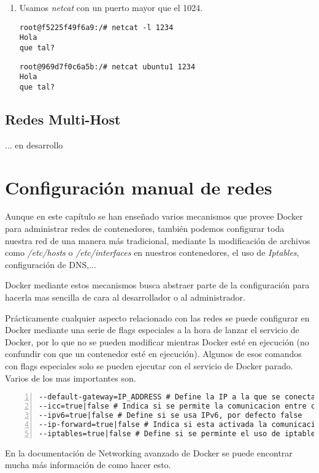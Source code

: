 \begin{enumerate}
\begin{enumerate}
					\item Usamos \textit{netcat} con un puerto mayor que el 1024.
					\begin{lstlisting}[style=consola]
root@f5225f49f6a9:/# netcat -l 1234
Hola
que tal?
					\end{lstlisting}
					\begin{lstlisting}[style=consola]
root@969d7f0c6a5b:/# netcat ubuntu1 1234
Hola
que tal?
					\end{lstlisting}
				\end{enumerate}
			\end{enumerate}
			
		\subsection{Redes Multi-Host}
		 {\color{red}... en desarrollo}
		
	
	\section{Configuración manual de redes}
	Aunque en este capítulo se han enseñado varios mecanismos que provee Docker para administrar redes de contenedores, también podemos configurar toda nuestra red de una manera más tradicional, mediante la modificación de archivos como \emph{/etc/hosts} o \emph{/etc/interfaces} en nuestros contenedores, el uso de \emph{Iptables}, configuración de DNS,... 
	
	Docker mediante estos mecanismos busca abstraer parte de la configuración para hacerla mas sencilla de cara al desarrollador o al administrador.
	
	Prácticamente cualquier aspecto relacionado con las redes se puede configurar en Docker mediante una serie de flags especiales a la hora de lanzar el servicio de Docker, por lo que no se pueden modificar mientras Docker esté en ejecución (no confundir con que un contenedor esté en ejecución). Algunos de esos comandos con flags especiales solo se pueden ejecutar con el servicio de Docker parado. Varios de los mas importantes son.
	
	\begin{lstlisting}[style=consola,numbers=left]
--default-gateway=IP_ADDRESS # Define la IP a la que se conectaran los contenedores de Docker al crearse, por defecto se usa la de docker0
--icc=true|false # Indica si se permite la comunicacion entre contenedores, por defecto true
--ipv6=true|false # Define si se usa IPv6, por defecto false
--ip-forward=true|false # Indica si esta activada la comunicacion entre los contenedores y el exterior, por defecto true
--iptables=true|false # Define si se perminte el uso de iptables (filtra direcciones y puertos, se usa como firewall en sistemas tipo UNIX)
	\end{lstlisting}
	
	En la documentación de Networking avanzado de Docker \cite{docker-network-advanced} se puede encontrar mucha más información de como hacer esto.
	